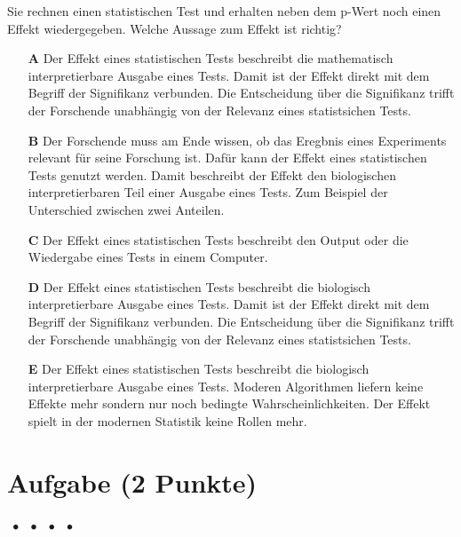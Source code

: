 \documentclass[a4paper, 9pt]{scrartcl}\usepackage[]{graphicx}\usepackage[]{xcolor}
\begin{document}
Sie rechnen einen statistischen Test und erhalten neben dem p-Wert noch einen Effekt wiedergegeben. Welche Aussage zum Effekt ist richtig?



\begin{enumerate}
\item [\textbf{A} \msquare] Der Effekt eines statistischen Tests beschreibt die mathematisch interpretierbare Ausgabe eines Tests. Damit ist der Effekt direkt mit dem Begriff der Signifikanz verbunden. Die Entscheidung über die Signifikanz trifft der Forschende unabhängig von der Relevanz eines statistsichen Tests.
\item [\textbf{B} \msquare] Der Forschende muss am Ende wissen, ob das Eregbnis eines Experiments relevant für seine Forschung ist. Dafür kann der Effekt eines statistischen Tests genutzt werden. Damit beschreibt der Effekt den biologischen interpretierbaren Teil einer Ausgabe eines Tests. Zum Beispiel der Unterschied zwischen zwei Anteilen.
\item [\textbf{C} \msquare] Der Effekt eines statistischen Tests beschreibt den Output oder die Wiedergabe eines Tests in einem Computer.
\item [\textbf{D} \msquare] Der Effekt eines statistischen Tests beschreibt die biologisch interpretierbare Ausgabe eines Tests. Damit ist der Effekt direkt mit dem Begriff der Signifikanz verbunden. Die Entscheidung über die Signifikanz trifft der Forschende unabhängig von der Relevanz eines statistsichen Tests.
\item [\textbf{E} \msquare] Der Effekt eines statistischen Tests beschreibt die biologisch interpretierbare Ausgabe eines Tests. Moderen Algorithmen liefern keine Effekte mehr sondern nur noch bedingte Wahrscheinlichkeiten. Der Effekt spielt in der modernen Statistik keine Rollen mehr.
\end{enumerate}

\section{Aufgabe \hfill (2 Punkte)}

\ifcollection
\begin{flushright}
\tiny\vspace{-2Ex}
\textbf{\examinhaltstart}
\exammodulemathstat $\;\bullet$
\exammodulestat $\;\bullet$
\exammodulestatbbv $\;\bullet$
\exammodulestatversuch $\;\bullet$
\exammodulebiostat
\vspace{-1Ex}
\end{flushright}
\fi
\end{document}
